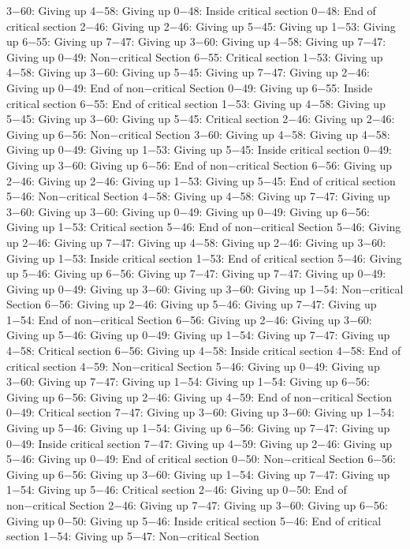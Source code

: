 3−60: Giving up
4−58: Giving up
0−48: Inside critical section
0−48: End of critical section
2−46: Giving up
2−46: Giving up
5−45: Giving up
1−53: Giving up
6−55: Giving up
7−47: Giving up
3−60: Giving up
4−58: Giving up
7−47: Giving up
0−49: Non−critical Section
6−55: Critical section
1−53: Giving up
4−58: Giving up
3−60: Giving up
5−45: Giving up
7−47: Giving up
2−46: Giving up
0−49: End of non−critical Section
0−49: Giving up
6−55: Inside critical section
6−55: End of critical section
1−53: Giving up
4−58: Giving up
5−45: Giving up
3−60: Giving up
5−45: Critical section
2−46: Giving up
2−46: Giving up
6−56: Non−critical Section
3−60: Giving up
4−58: Giving up
4−58: Giving up
0−49: Giving up
1−53: Giving up
5−45: Inside critical section
0−49: Giving up
3−60: Giving up
6−56: End of non−critical Section
6−56: Giving up
2−46: Giving up
2−46: Giving up
1−53: Giving up
5−45: End of critical section
5−46: Non−critical Section
4−58: Giving up
4−58: Giving up
7−47: Giving up
3−60: Giving up
3−60: Giving up
0−49: Giving up
0−49: Giving up
6−56: Giving up
1−53: Critical section
5−46: End of non−critical Section
5−46: Giving up
2−46: Giving up
7−47: Giving up
4−58: Giving up
2−46: Giving up
3−60: Giving up
1−53: Inside critical section
1−53: End of critical section
5−46: Giving up
5−46: Giving up
6−56: Giving up
7−47: Giving up
7−47: Giving up
0−49: Giving up
0−49: Giving up
3−60: Giving up
3−60: Giving up
1−54: Non−critical Section
6−56: Giving up
2−46: Giving up
5−46: Giving up
7−47: Giving up
1−54: End of non−critical Section
6−56: Giving up
2−46: Giving up
3−60: Giving up
5−46: Giving up
0−49: Giving up
1−54: Giving up
7−47: Giving up
4−58: Critical section
6−56: Giving up
4−58: Inside critical section
4−58: End of critical section
4−59: Non−critical Section
5−46: Giving up
0−49: Giving up
3−60: Giving up
7−47: Giving up
1−54: Giving up
1−54: Giving up
6−56: Giving up
6−56: Giving up
2−46: Giving up
4−59: End of non−critical Section
0−49: Critical section
7−47: Giving up
3−60: Giving up
3−60: Giving up
1−54: Giving up
5−46: Giving up
1−54: Giving up
6−56: Giving up
7−47: Giving up
0−49: Inside critical section
7−47: Giving up
4−59: Giving up
2−46: Giving up
5−46: Giving up
0−49: End of critical section
0−50: Non−critical Section
6−56: Giving up
6−56: Giving up
3−60: Giving up
1−54: Giving up
7−47: Giving up
1−54: Giving up
5−46: Critical section
2−46: Giving up
0−50: End of non−critical Section
2−46: Giving up
7−47: Giving up
3−60: Giving up
6−56: Giving up
0−50: Giving up
5−46: Inside critical section
5−46: End of critical section
1−54: Giving up
5−47: Non−critical Section
